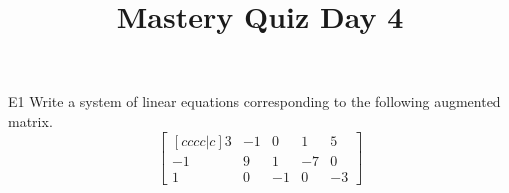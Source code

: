 \documentclass{sbgLAquiz}
\title{Mastery Quiz Day 4 }
\begin{document}
\begin{problem}{E1}
Write a system of linear equations corresponding to the following
augmented matrix.
\[
\begin{bmatrix}[cccc|c]
3 & -1 & 0 & 1 & 5 \\
-1 & 9 & 1 & -7 & 0 \\
1 & 0 & -1 & 0 & -3
\end{bmatrix}
\]
\end{problem}
\end{document}
